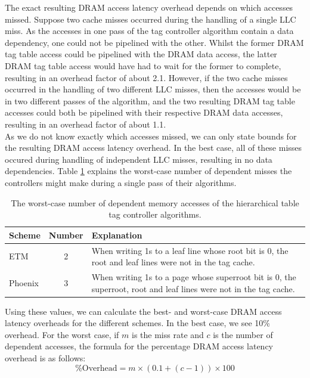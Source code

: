 The exact resulting DRAM access latency overhead depends on which accesses missed. Suppose two cache misses occurred during the handling of a single LLC miss. As the accesses in one pass of the tag controller algorithm contain a data dependency, one could not be pipelined with the other. Whilst the former DRAM tag table access could be pipelined with the DRAM data access, the latter DRAM tag table access would have had to wait for the former to complete, resulting in an overhead factor of about 2.1. However, if the two cache misses occurred in the handling of two different LLC misses, then the accesses would be in two different passes of the algorithm, and the two resulting DRAM tag table accesses could both be pipelined with their respective DRAM data accesses, resulting in an overhead factor of about 1.1.\\
As we do not know exactly which accesses missed, we can only state bounds for the resulting DRAM access latency overhead. In the best case, all of these misses occured during handling of independent LLC misses, resulting in no data dependencies. Table \ref{tab:bwc} explains the worst-case number of dependent misses the controllers might make during a single pass of their algorithms.

\begin{table}[H]
	\centering
	\begin{tabular}{|l|c|p{10cm}|}
		\hline
		\textbf{Scheme} & \textbf{Number} & \textbf{Explanation}\\
		\hline
		ETM & 2 & When writing 1s to a leaf line whose root bit is 0, the root and leaf lines were not in the tag cache.\\
		\hline
		Phoenix & 3 & When writing 1s to a page whose superroot bit is 0, the superroot, root and leaf lines were not in the tag cache.\\
		\hline
	\end{tabular}
	\caption{The worst-case number of dependent memory accesses of the hierarchical table tag controller algorithms.}
	\label{tab:bwc}
\end{table}

Using these values, we can calculate the best- and worst-case DRAM access latency overheads for the different schemes. In the best case, we see 10\% overhead. For the worst case, if $m$ is the miss rate and $c$ is the number of dependent accesses, the formula for the percentage DRAM access latency overhead is as follows:
\begin{equation}
	\label{eq:fac}
	\text{\% Overhead} = m \times (0.1 + (c-1)) \times 100
\end{equation}

